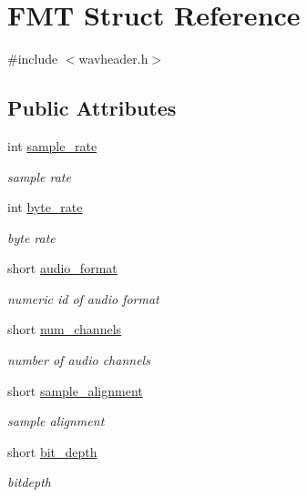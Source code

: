\hypertarget{structFMT}{}\section{F\+MT Struct Reference}
\label{structFMT}


{\ttfamily \#include $<$wavheader.\+h$>$}

\subsection*{Public Attributes}
\begin{DoxyCompactItemize}
\item 
int \hyperlink{structFMT_ad09f55ae3078ca9c3545204c4b241910}{sample\+\_\+rate}
\begin{DoxyCompactList}\small\item\em sample rate \end{DoxyCompactList}\item 
int \hyperlink{structFMT_ada872d0d97744d55e35530140ac22003}{byte\+\_\+rate}
\begin{DoxyCompactList}\small\item\em byte rate \end{DoxyCompactList}\item 
short \hyperlink{structFMT_adfa82d8ed231960ad3811652749bc4f4}{audio\+\_\+format}
\begin{DoxyCompactList}\small\item\em numeric id of audio format \end{DoxyCompactList}\item 
short \hyperlink{structFMT_a553bb5b9d942960581a539a8d3a03293}{num\+\_\+channels}
\begin{DoxyCompactList}\small\item\em number of audio channels \end{DoxyCompactList}\item 
short \hyperlink{structFMT_a276dd9ac6e17e65d816c7b54f76af43c}{sample\+\_\+alignment}
\begin{DoxyCompactList}\small\item\em sample alignment \end{DoxyCompactList}\item 
short \hyperlink{structFMT_ae26713b307b48900929b3386cc6f8a09}{bit\+\_\+depth}
\begin{DoxyCompactList}\small\item\em bitdepth \end{DoxyCompactList}\end{DoxyCompactItemize}


